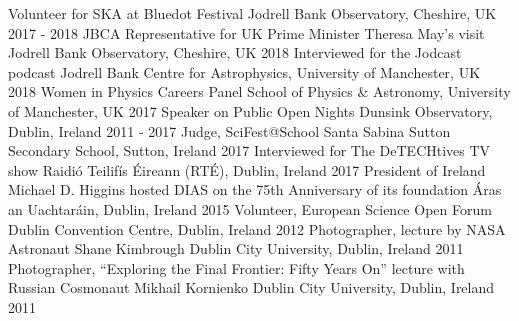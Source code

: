 \begin{cvpress}
   \cvpres
   {Volunteer for SKA at Bluedot Festival}
    {Jodrell Bank Observatory, Cheshire, UK}
    {2017 - 2018}
   \cvpres
   {JBCA Representative for UK Prime Minister Theresa May's visit}
    {Jodrell Bank Observatory, Cheshire, UK}
    {2018}
   \cvpres
   {Interviewed for the Jodcast podcast}
    {Jodrell Bank Centre for Astrophysics, University of Manchester, UK}
    {2018}
   \cvpres
   {Women in Physics Careers Panel}
    {School of Physics \& Astronomy, University of Manchester, UK}
    {2017}
   \cvpres
   {Speaker on Public Open Nights}
    {Dunsink Observatory, Dublin, Ireland}
    {2011 - 2017}
   \cvpres
   {Judge, SciFest@School}
    {Santa Sabina Sutton Secondary School, Sutton, Ireland}
    {2017}
   \cvpres
   {Interviewed for The DeTECHtives TV show}
    {Raidi{\'o} Teilif{\'i}s {\'E}ireann (RT{\'E}), Dublin, Ireland}
    {2017}
   \cvpres
   {President of Ireland Michael D. Higgins hosted DIAS on the 75th Anniversary of its foundation}
    {{\'A}ras an Uachtar{\'a}in, Dublin, Ireland}
    {2015}
   \cvpres
   {Volunteer, European Science Open Forum}
    {Dublin Convention Centre, Dublin, Ireland}
    {2012}
   \cvpres
   	{Photographer, lecture by NASA Astronaut Shane Kimbrough}
    {Dublin City University, Dublin, Ireland}
    {2011}
   \cvpres
   	{Photographer, ``Exploring the Final Frontier: Fifty Years On'' lecture with Russian Cosmonaut Mikhail Kornienko}
    {Dublin City University, Dublin, Ireland}
    {2011}
\end{cvpress}


